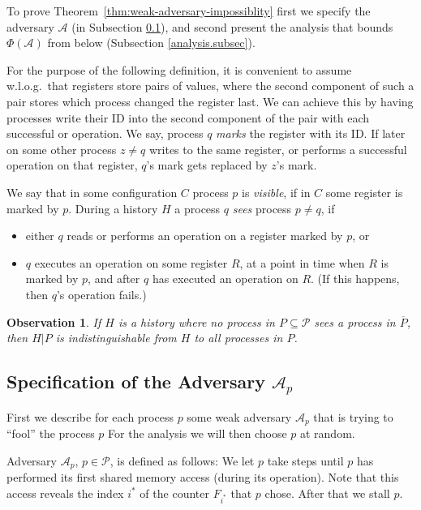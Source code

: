 \documentclass[11pt,letterpaper]{article}
\newcommand{\xwrite}{\text{\tt write}\xspace}
\newcommand{\SC}{\text{\tt SC}\xspace}
\newcommand{\LL}{\text{\tt LL}\xspace}
\newtheorem{observation}[theorem]{Observation}
\renewcommand{\AA}{\mathcal{A}}
\newcommand{\PP}{\mathcal{P}}
\begin{document}
To prove Theorem~\ref{thm:weak-adversary-impossiblity}
first we specify the adversary $\AA$ (in Subsection \ref{adversary.subsec}),
and second present the analysis that bounds $\Phi(\AA)$ from below (Subsection \ref{analysis.subsec}).

For the purpose of the following definition, it is convenient to assume w.l.o.g.\ that registers store pairs of values, where the second component of such a pair stores which process changed the register last.
We can achieve this by having processes write their ID into the second component of the pair with each successful \xwrite or \SC operation.
We say, process $q$ \emph{marks} the register with its ID.
If later on some other process $z\neq q$ writes to the same register, or performs a successful \SC operation on that register, $q$'s mark gets replaced by $z$'s mark.

We say that in some configuration $C$ process $p$ is \emph{visible}, if in $C$ some register is marked by $p$.
During a history $H$ a process $q$ \emph{sees} process $p\neq q$, if
\begin{itemize}
 \item either $q$ reads or performs an \LL operation on a register marked by $p$, or
 \item $q$ executes an \SC operation on some register $R$, at a point in time when $R$ is marked by $p$, and after $q$ has executed an \LL operation on $R$.
 (If this happens, then $q$'s \SC operation fails.)
\end{itemize}


\begin{observation}\label{obs:indistinguishable}
If $H$ is a history where no process in $P\subseteq\PP$ sees a process in $\overline{P}$, then $H|P$ is indistinguishable from $H$ to all processes in $P$.
\end{observation}



\subsection{Specification of the Adversary $\AA_p$}
\label{adversary.subsec}
First we describe for each process $p$ some weak adversary $\AA_p$ that is trying to ``fool'' the process $p$
For the analysis we will then choose $p$ at random.

Adversary $\AA_p$, $p\in\PP$, is defined as follows:
We let $p$ take steps until $p$ has performed its first shared memory access (during its \FAI{} operation).
Note that this access reveals the index $i^\ast$ of the counter $F_{i^\ast}$ that $p$ chose.
After that we stall $p$.
\end{document}
